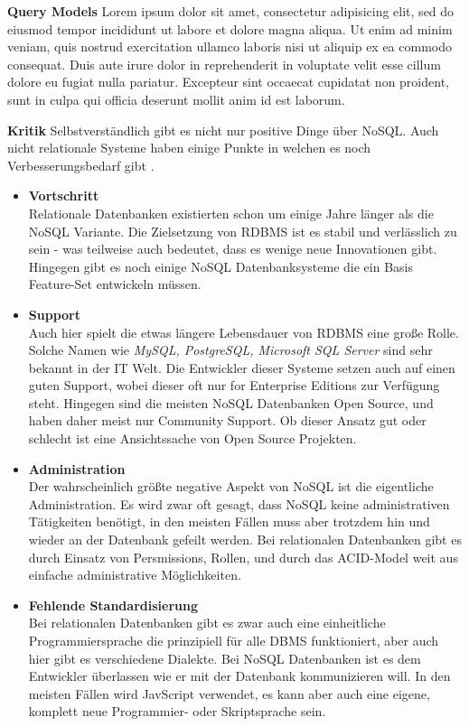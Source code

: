 \textbf{Query Models}
Lorem ipsum dolor sit amet, consectetur adipisicing elit, sed do eiusmod
tempor incididunt ut labore et dolore magna aliqua. Ut enim ad minim veniam,
quis nostrud exercitation ullamco laboris nisi ut aliquip ex ea commodo
consequat. Duis aute irure dolor in reprehenderit in voluptate velit esse
cillum dolore eu fugiat nulla pariatur. Excepteur sint occaecat cupidatat non
proident, sunt in culpa qui officia deserunt mollit anim id est laborum.

\textbf{Kritik\newline}
Selbstverständlich gibt es nicht nur positive Dinge über NoSQL. Auch nicht relationale Systeme haben einige Punkte in welchen es noch Verbesserungsbedarf gibt \cite{MELD.CH2-noSQL.sqlvsnosql}. 

\begin{itemize}
	\item \textbf{Vortschritt\\}
	Relationale Datenbanken existierten schon um einige Jahre länger als die NoSQL Variante. Die Zielsetzung von RDBMS ist es stabil und verlässlich zu sein - was teilweise auch bedeutet, dass es wenige neue Innovationen gibt. Hingegen gibt es noch einige NoSQL Datenbanksysteme die ein Basis Feature-Set entwickeln müssen.

	\item \textbf{Support\\}
	Auch hier spielt die etwas längere Lebensdauer von RDBMS eine große Rolle. Solche Namen wie \textit{MySQL, PostgreSQL, Microsoft SQL Server} sind sehr bekannt in der IT Welt. Die Entwickler dieser Systeme setzen auch auf einen guten Support, wobei dieser oft nur for Enterprise Editions zur Verfügung steht. Hingegen sind die meisten NoSQL Datenbanken Open Source, und haben daher meist nur Community Support. Ob dieser Ansatz gut oder schlecht ist eine Ansichtssache von Open Source Projekten.

	\item \textbf{Administration\\}
	Der wahrscheinlich größte negative Aspekt von NoSQL ist die eigentliche Administration. Es wird zwar oft gesagt, dass NoSQL keine administrativen Tätigkeiten benötigt, in den meisten Fällen muss aber trotzdem hin und wieder an der Datenbank gefeilt werden. Bei relationalen Datenbanken gibt es durch Einsatz von Persmissions, Rollen, und durch das ACID-Model weit aus einfache administrative Möglichkeiten.

	\item \textbf{Fehlende Standardisierung\\}
	Bei relationalen Datenbanken gibt es zwar auch eine einheitliche Programmiersprache die prinzipiell für alle DBMS funktioniert, aber auch hier gibt es verschiedene Dialekte. Bei NoSQL Datenbanken ist es dem Entwickler überlassen wie er mit der Datenbank kommunizieren will. In den meisten Fällen wird JavScript verwendet, es kann aber auch eine eigene, komplett neue Programmier- oder Skriptsprache sein.
\end{itemize}

